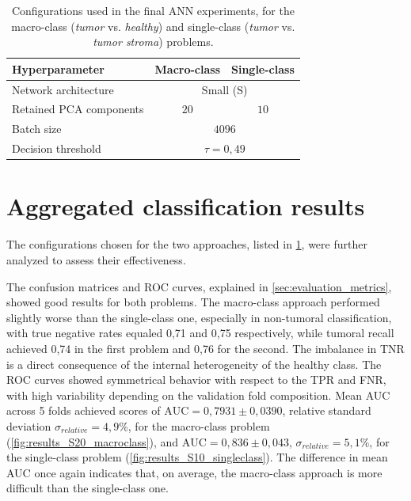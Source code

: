 \begin{table}[H]
    \centering
    \begin{tabular}{|l|c|c|}
        \hline
        \textbf{Hyperparameter} & \textbf{Macro-class} & \textbf{Single-class} \\
        \hline
        Network architecture & \multicolumn{2}{c|}{Small (S)} \\
        \hline
        Retained PCA components & \(20\) & \(10\) \\
        \hline
        Batch size & \multicolumn{2}{c|}{\(4096\)} \\
        \hline
        Decision threshold & \multicolumn{2}{c|}{\(\tau=0{,}49\)} \\
        \hline
    \end{tabular}
    \caption{Configurations used in the final ANN experiments, for the macro-class (\textit{tumor} vs. \textit{healthy}) and single-class (\textit{tumor} vs. \textit{tumor stroma}) problems.}
    \label{tab:selected_hyperparameters}
\end{table}


\section{Aggregated classification results}
\label{sec:aggregated_classification_results}

The configurations chosen for the two approaches, listed in \cref{tab:selected_hyperparameters}, were further analyzed to assess their effectiveness.

The confusion matrices and ROC curves, explained in \cref{sec:evaluation_metrics}, showed good results for both problems. The macro-class approach performed slightly worse than the single-class one, especially in non-tumoral classification, with true negative rates equaled 0,71 and 0,75 respectively, while tumoral recall achieved 0,74 in the first problem and 0,76 for the second. The imbalance in TNR is a direct consequence of the internal heterogeneity of the healthy class. The ROC curves showed symmetrical behavior with respect to the TPR and FNR, with high variability depending on the validation fold composition. Mean AUC across 5 folds achieved scores of $\text{AUC} = 0{,}7931\pm0{,}0390$, relative standard deviation $\sigma_{relative} = 4{,}9\%$, for the macro-class problem (\cref{fig:results_S20_macroclass}), and $\text{AUC} = 0{,}836\pm0{,}043$, $\sigma_{relative} = 5{,}1\%$, for the single-class problem (\cref{fig:results_S10_singleclass}). The difference in mean AUC once again indicates that, on average, the macro-class approach is more difficult than the single-class one.


